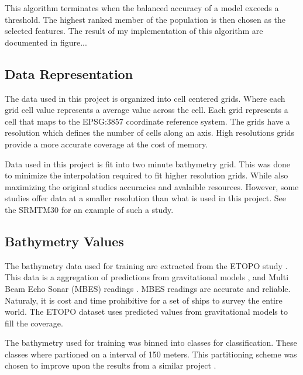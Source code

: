 \par
This algorithm terminates when the balanced accuracy of a model exceeds a threshold.
The highest ranked member of the population is then chosen as the selected features.
The result of my implementation of this algorithm are documented in figure...

\subsection{Data Representation}
The data used in this project is organized into cell centered grids.
Where each grid cell value represents a average value across the cell.
Each grid represents a cell that maps to the EPSG:3857 coordinate reference system.
The grids have a resolution which defines the number of cells along an axis.
High resolutions grids provide a more accurate coverage at the cost of memory.

\par
Data used in this project is fit into two minute bathymetry grid. 
This was done to minimize the interpolation required to fit higher resolution grids.
While also maximizing the original studies accuracies and avalaible resources.
However, some studies offer data at a smaller resolution than what is used in this project.
See the SRMTM30 \cite{becker2009global} for an example of such a study.

\subsection{Bathymetry Values}
The bathymetry data used for training are extracted from the ETOPO study \cite{national1988etopo}.
This data is a aggregation of predictions from gravitational models \cite{smith1997global} \cite{smith1994bathymetric}, and Multi Beam Echo Sonar (MBES) readings \cite{farr1980multibeam}.
MBES readings are accurate and reliable. 
Naturaly, it is cost and time prohibitive for a set of ships to survey the entire world.
The ETOPO dataset uses predicted values from gravitational models to fill the coverage.

\par
The bathymetry used for training was binned into classes for classification.
These classes where partioned on a interval of 150 meters.
This partitioning scheme was chosen to improve upon the results from a similar project \cite{national1988etopo}.


